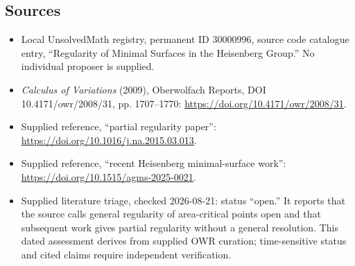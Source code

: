 \documentclass[11pt]{article}
\begin{document}
\subsection{Sources}
\begin{itemize}
\item Local UnsolvedMath registry, permanent ID \(30000996\), source code catalogue entry, ``Regularity of Minimal Surfaces in the Heisenberg Group.'' No individual proposer is supplied.
\item \emph{Calculus of Variations} (2009), Oberwolfach Reports, DOI 10.4171/owr/2008/31, pp. 1707--1770: \url{https://doi.org/10.4171/owr/2008/31}.
\item Supplied reference, ``partial regularity paper'': \url{https://doi.org/10.1016/j.na.2015.03.013}.
\item Supplied reference, ``recent Heisenberg minimal-surface work'': \url{https://doi.org/10.1515/agms-2025-0021}.
\item Supplied literature triage, checked 2026-08-21: status ``open.'' It reports that the source calls general regularity of area-critical points open and that subsequent work gives partial regularity without a general resolution. This dated assessment derives from supplied OWR curation; time-sensitive status and cited claims require independent verification.
\end{itemize}
\end{document}
